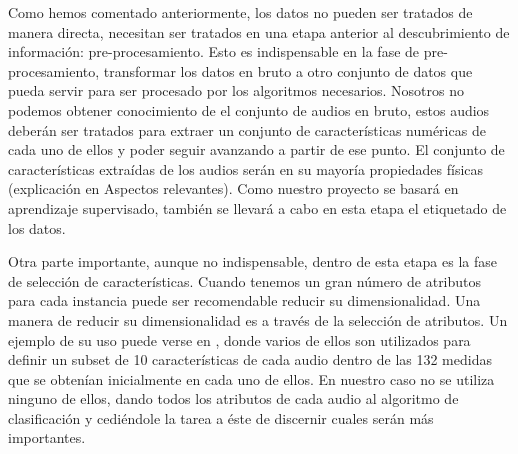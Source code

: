 Como hemos comentado anteriormente, los datos no pueden ser tratados de manera directa, necesitan ser tratados en una etapa anterior al descubrimiento de información: pre-procesamiento. Esto es indispensable en la fase de pre-procesamiento, transformar los datos en bruto a otro conjunto de datos que pueda servir para ser procesado por los algoritmos necesarios. Nosotros no podemos obtener conocimiento de el conjunto de audios en bruto, estos audios deberán ser tratados para extraer un conjunto de características numéricas de cada uno de ellos y poder seguir avanzando a partir de ese punto. El conjunto de características extraídas de los audios serán en su mayoría propiedades físicas (explicación en Aspectos relevantes). Como nuestro proyecto se basará en aprendizaje supervisado, también se llevará a cabo en esta etapa el etiquetado de los datos.

Otra parte importante, aunque no indispensable, dentro de esta etapa es la fase de selección de características. Cuando tenemos un gran número de atributos para cada instancia puede ser recomendable reducir su dimensionalidad. Una manera de reducir su dimensionalidad es a través de la selección de atributos. Un ejemplo de su uso puede verse en \cite{MxLtNovel}, donde varios de ellos son utilizados para definir un subset de 10 características de cada audio dentro de las 132 medidas que se obtenían inicialmente en cada uno de ellos. En nuestro caso no se utiliza ninguno de ellos, dando todos los atributos de cada audio al algoritmo de clasificación y cediéndole la tarea  a éste de discernir cuales serán más importantes. \cite{DMprocess}

